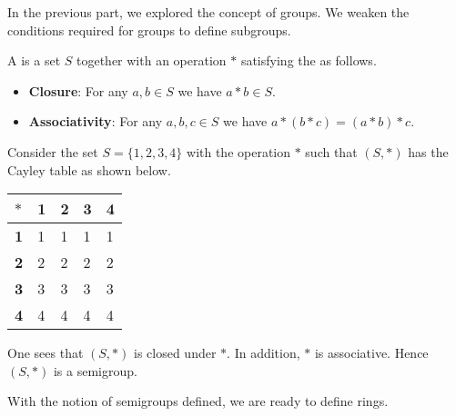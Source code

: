 In the previous part, we explored the concept of groups. We weaken the conditions required for groups to define subgroups.
\begin{definition}
    A  is a set $S$ together with an operation $\ast$ satisfying the  as follows.
    \begin{itemize}
        \item \textbf{Closure}: For any $a, b \in S$ we have $a\ast b \in S$.
        \item \textbf{Associativity}: For any $a, b, c \in S$ we have $a \ast (b \ast c) = (a \ast b) \ast c$.
    \end{itemize}
\end{definition}
\begin{example}
    Consider the set $S = \{1, 2, 3, 4\}$ with the operation $\ast$ such that $(S, \ast)$ has the Cayley table as shown below.
    \begin{table}[h]
        \centering
        \begin{tabular}{|l|l|l|l|l|}
            \hline
            $\ast$ & \textbf{1} & \textbf{2} & \textbf{3} & \textbf{4} \\ \hline
            \textbf{1} & 1 & 1 & 1 & 1 \\ \hline
            \textbf{2} & 2 & 2 & 2 & 2 \\ \hline
            \textbf{3} & 3 & 3 & 3 & 3 \\ \hline
            \textbf{4} & 4 & 4 & 4 & 4 \\ \hline
        \end{tabular}
    \end{table}

    One sees that $(S, \ast)$ is closed under $\ast$. In addition, $\ast$ is associative. Hence $(S, \ast)$ is a semigroup.
\end{example}

With the notion of semigroups defined, we are ready to define rings.

\newpage

